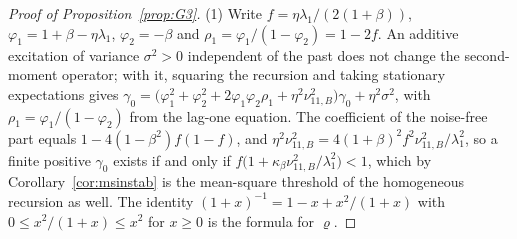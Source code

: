 \documentclass[11pt]{article}
\theoremstyle{remark}
\begin{document}
\begin{proof}[Proof of Proposition~\ref{prop:G3}]
(1) Write $f=\eta\lambda_1/(2(1+\beta))$, $\varphi_1=1+\beta-\eta\lambda_1$, $\varphi_2=-\beta$ and $\rho_1=\varphi_1/(1-\varphi_2)=1-2f$. An additive excitation of variance $\sigma^2>0$ independent of the past does not change the second-moment operator; with it, squaring the recursion and taking stationary expectations gives $\gamma_0=\big(\varphi_1^2+\varphi_2^2+2\varphi_1\varphi_2\rho_1+\eta^2\nu_{11,B}^2\big)\gamma_0+\eta^2\sigma^2$, with $\rho_1=\varphi_1/(1-\varphi_2)$ from the lag-one equation. The coefficient of the noise-free part equals $1-4(1-\beta^2)f(1-f)$, and $\eta^2\nu_{11,B}^2=4(1+\beta)^2f^2\nu_{11,B}^2/\lambda_1^2$, so a finite positive $\gamma_0$ exists if and only if $f\big(1+\kappa_\beta\nu_{11,B}^2/\lambda_1^2\big)<1$, which by Corollary~\ref{cor:msinstab} is the mean-square threshold of the homogeneous recursion as well. The identity $(1+x)^{-1}=1-x+x^2/(1+x)$ with $0\le x^2/(1+x)\le x^2$ for $x\ge0$ is the formula for $\varrho$.


\end{proof}
\end{document}
